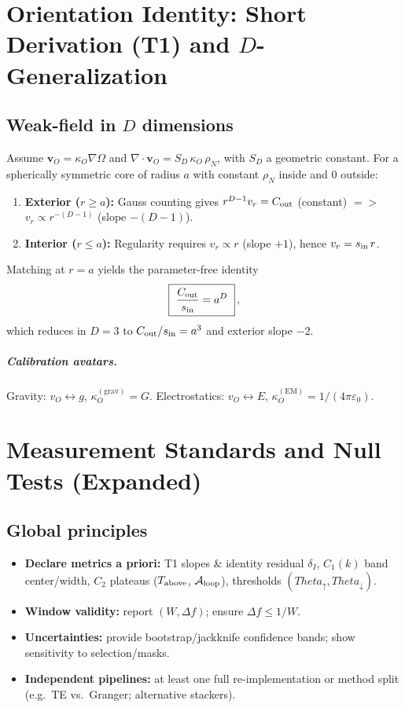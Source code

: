 \documentclass[12pt,a4paper,oneside]{scrreprt}
\def\Theta{Theta}%
\def\Rightarrow{=>}%
\begin{document}
\chapter{Orientation Identity: Short Derivation (T1) and $D$-Generalization}\label{app:T1}
\section*{Weak-field in $D$ dimensions}
Assume $\mathbf v_O=\kappa_O\nabla\Omega$ and $\nabla\!\cdot\mathbf v_O=S_D\,\kappa_O\,\rho_N$, with $S_D$ a geometric constant. For a spherically symmetric core of radius $a$ with constant $\rho_N$ inside and $0$ outside:
\begin{enumerate}
\item \textbf{Exterior ($r\ge a$):} Gauss counting gives $r^{D-1}v_r=C_{\rm out}$ (constant) $\Rightarrow$ $v_r\propto r^{-(D-1)}$ (slope $-(D-1)$).
\item \textbf{Interior ($r\le a$):} Regularity requires $v_r\propto r$ (slope $+1$), hence $v_r=s_{\rm in}\,r$.
\end{enumerate}
Matching at $r=a$ yields the parameter-free identity
\[
\boxed{~\frac{C_{\rm out}}{s_{\rm in}}=a^{D}~}\,,
\]
which reduces in $D=3$ to $C_{\rm out}/s_{\rm in}=a^3$ and exterior slope $-2$.

\paragraph{Calibration avatars.}
Gravity: $v_O\leftrightarrow g$, $\kappa_O^{(\mathrm{grav})}=G$. \quad
Electrostatics: $v_O\leftrightarrow E$, $\kappa_O^{(\mathrm{EM})}=1/(4\pi\varepsilon_0)$.

\chapter{Measurement Standards and Null Tests (Expanded)}\label{app:standards}
\section*{Global principles}
\begin{itemize}
\item \textbf{Declare metrics a priori:} T1 slopes \& identity residual $\delta_I$, $C_1(k)$ band center/width, $C_2$ plateaus ($T_{\rm above}$, $\mathcal A_{\rm loop}$), thresholds $(\Theta_\uparrow,\Theta_\downarrow)$.
\item \textbf{Window validity:} report $(W,\Delta f)$; ensure $\Delta f\le 1/W$.
\item \textbf{Uncertainties:} provide bootstrap/jackknife confidence bands; show sensitivity to selection/masks.
\item \textbf{Independent pipelines:} at least one full re-implementation or method split (e.g.\ TE vs.\ Granger; alternative stackers).
\end{itemize}
\end{document}
